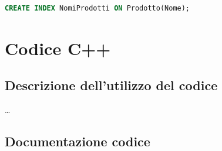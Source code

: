 \documentclass[10pt]{article}
\begin{document}
\begin{lstlisting}[language=SQL]
    CREATE INDEX NomiProdotti ON Prodotto(Nome);
\end{lstlisting}

\section{Codice C++}

\subsection{Descrizione dell'utilizzo del codice}

\dots

\subsection{Documentazione codice}
\end{document}
